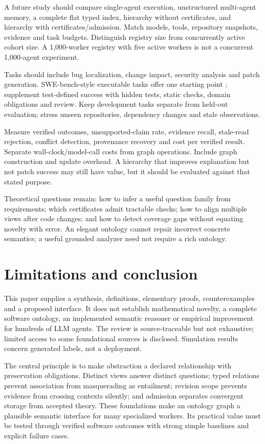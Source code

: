 \documentclass[11pt]{article}
\begin{document}
A future study should compare single-agent execution, unstructured multi-agent memory, a complete flat typed index, hierarchy without certificates, and hierarchy with certificates/admission. Match models, tools, repository snapshots, evidence and task budgets. Distinguish registry size from concurrently active cohort size. A 1,000-worker registry with five active workers is not a concurrent 1,000-agent experiment.

Tasks should include bug localization, change impact, security analysis and patch generation. SWE-bench-style executable tasks offer one starting point \citep{swebench2024}; supplement test-defined success with hidden tests, static checks, domain obligations and review. Keep development tasks separate from held-out evaluation; stress unseen repositories, dependency changes and stale observations.

Measure verified outcomes, unsupported-claim rate, evidence recall, stale-read rejection, conflict detection, provenance recovery and cost per verified result. Separate wall-clock/model-call costs from graph operations. Include graph construction and update overhead. A hierarchy that improves explanation but not patch success may still have value, but it should be evaluated against that stated purpose.

Theoretical questions remain: how to infer a useful question family from requirements; which certificates admit tractable checks; how to align multiple views after code changes; and how to detect coverage gaps without equating novelty with error. An elegant ontology cannot repair incorrect concrete semantics; a useful grounded analyzer need not require a rich ontology.

\section{Limitations and conclusion}
This paper supplies a synthesis, definitions, elementary proofs, counterexamples and a proposed interface. It does not establish mathematical novelty, a complete software ontology, an implemented semantic reasoner or empirical improvement for hundreds of LLM agents. The review is source-traceable but not exhaustive; limited access to some foundational sources is disclosed. Simulation results concern generated labels, not a deployment.

The central principle is to make abstraction a declared relationship with preservation obligations. Distinct views answer distinct questions; typed relations prevent association from masquerading as entailment; revision scope prevents evidence from crossing contexts silently; and admission separates convergent storage from accepted theory. These foundations make an ontology graph a plausible semantic interface for many specialized workers. Its practical value must be tested through verified software outcomes with strong simple baselines and explicit failure cases.
\end{document}
